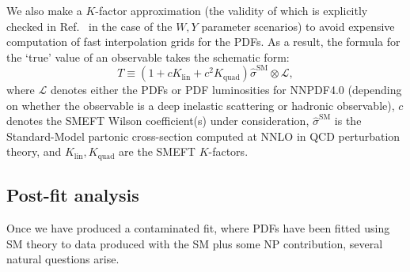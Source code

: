 \documentclass[withindex,glossary]{cam-thesis}
\begin{document}
We also make a $K$-factor approximation (the validity of which is explicitly checked in Ref.~\cite{DYpaper} in the case of the $W,Y$ parameter scenarios) to avoid expensive computation of fast interpolation grids for the PDFs. As a result, the formula for the `true' value of an observable takes the schematic form:
\begin{equation}
T \equiv \left(1 + cK_{\text{lin}} + c^2K_{\text{quad}}\right) \hat{\sigma}^{\text{SM}} \otimes \mathcal{L},
\end{equation}
where $\mathcal{L}$ denotes either the PDFs or PDF luminosities for NNPDF4.0 (depending on whether the observable is a deep inelastic scattering or hadronic observable), $c$ denotes the SMEFT Wilson coefficient(s) under consideration, $\hat{\sigma}^{\text{SM}}$ is the Standard-Model partonic cross-section computed at NNLO in QCD perturbation theory, and $K_{\text{lin}}, K_{\text{quad}}$ are the SMEFT $K$-factors.


%


\subsection{Post-fit analysis}
\label{subsec:postfit}

Once we have produced a contaminated fit, where PDFs have been fitted using SM theory to data produced with the SM plus some NP contribution, several natural questions arise.
\end{document}

